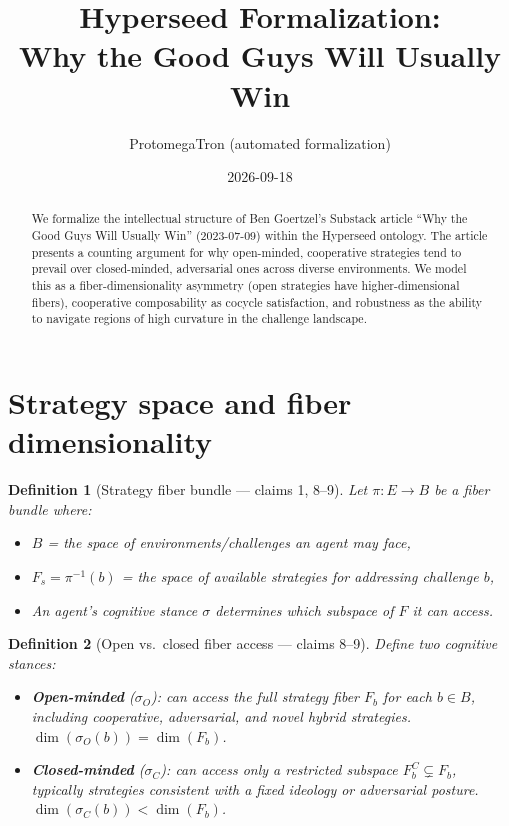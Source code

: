\documentclass[11pt,a4paper]{article}
\title{Hyperseed Formalization:\\
  Why the Good Guys Will Usually Win}
\author{ProtomegaTron (automated formalization)}
\date{2026-09-18}
\newtheorem{definition}{Definition}[section]
\begin{document}
\maketitle

\begin{abstract}
We formalize the intellectual structure of Ben Goertzel's Substack article
``Why the Good Guys Will Usually Win'' (2023-07-09) within the Hyperseed
ontology. The article presents a counting argument for why open-minded,
cooperative strategies tend to prevail over closed-minded, adversarial ones
across diverse environments. We model this as a fiber-dimensionality
asymmetry (open strategies have higher-dimensional fibers), cooperative
composability as cocycle satisfaction, and robustness as the ability to
navigate regions of high curvature in the challenge landscape.
\end{abstract}

\tableofcontents

\section{Strategy space and fiber dimensionality}
\label{sec:strategy}

\begin{definition}[Strategy fiber bundle --- claims 1, 8--9]
\label{def:strategy-bundle}
Let $\pi : E \to B$ be a fiber bundle where:
\begin{itemize}
\item $B$ = the space of environments/challenges an agent may face,
\item $F_s = \pi^{-1}(b)$ = the space of available strategies for
  addressing challenge $b$,
\item An agent's \emph{cognitive stance} $\sigma$ determines which
  subspace of $F$ it can access.
\end{itemize}
\end{definition}

\begin{definition}[Open vs.\ closed fiber access --- claims 8--9]
\label{def:open-closed}
Define two cognitive stances:
\begin{itemize}
\item \textbf{Open-minded} ($\sigma_O$): can access the full strategy
  fiber $F_b$ for each $b \in B$, including cooperative, adversarial,
  and novel hybrid strategies. $\dim(\sigma_O(b)) = \dim(F_b)$.
\item \textbf{Closed-minded} ($\sigma_C$): can access only a restricted
  subspace $F_b^C \subsetneq F_b$, typically strategies consistent with
  a fixed ideology or adversarial posture.
  $\dim(\sigma_C(b)) < \dim(F_b)$.
\end{itemize}
\end{definition}
\end{document}
